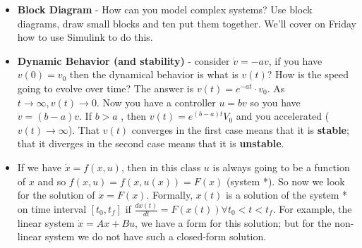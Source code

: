 \documentclass[12pt]{article}
\theoremstyle{definition}
\begin{document}
\begin{itemize}
    \item \textbf{Block Diagram} - How can you model complex systems? Use block diagrams, draw small blocks and ten put them together. We'll cover on Friday how to use Simulink to do this.
    \item \textbf{Dynamic Behavior (and stability)} - consider $\dot{v} = -av$, if you have $v(0) = v_0$ then the dynamical behavior is what is $v(t)$? How is the speed going to evolve over time? The answer is $v(t) = e^{-at} \cdot v_0$. As $t \rightarrow \infty, v(t) \rightarrow 0$. Now you have a controller $u = bv$ so you have $\dot{v} = (b-a)v$. If $b >a$ , then $v(t) = e^{(b-a)t}V_0$ and you accelerated ($v(t) \rightarrow \infty$).  That $v(t)$ converges in the first case means that it is \textbf{stable}; that it diverges in the second case means that it is \textbf{unstable}.
    \item If we have $\dot{x} = f(x,u)$, then in this class $u$ is always going to be a function of $x$ and so $f(x, u) = f(x, u(x)) = F(x)$ (system *). So now we look for the solution of $\dot{x} = F(x)$. Formally, $x(t)$ is a solution of the system * on time interval $[t_0, t_f]$ if $\frac{dx(t)}{dt} = F(x(t)) \forall t_0 < t < t_f$. For example, the linear system $\dot{x} = Ax + Bu$, we have a form for this solution; but for the non-linear system we do not have such a closed-form solution.
\end{itemize}
\end{document}
